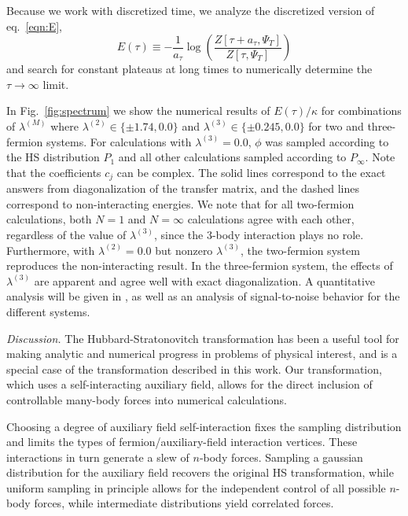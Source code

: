 \documentclass[aps,prl,twocolumn,showpacs,superscriptaddress,groupedaddress, final, nofootinbib]{revtex4}  %
\begin{document}
Because we work with discretized time, we analyze the discretized version of eq.~\eqref{eqn:E},
\begin{equation}
E(\tau)\equiv-\frac{1}{a_\tau}\log\left(\frac{Z[\tau+a_\tau,\Psi_T]}{Z[\tau,\Psi_T]}\right)
\end{equation}
and search for constant plateaus at long times to numerically determine the $\tau\rightarrow\infty$ limit.

In Fig.~\ref{fig:spectrum} we show the numerical results of $E(\tau)/\kappa$ for combinations of $\lambda^{(M)}$ where $\lambda^{(2)}\in\{\pm1.74,0.0\}$ and $\lambda^{(3)}\in\{\pm 0.245,0.0\}$ for two and three-fermion systems.   For calculations with $\lambda^{(3)}=0.0$,  $\phi$ was sampled according to the HS distribution $P_1$ and all other calculations sampled according to $P_\infty$.  Note that the coefficients $c_j$ can be complex.  The solid lines correspond to the exact answers from diagonalization of the transfer matrix, and the dashed lines correspond to non-interacting energies.  We note that for all two-fermion calculations, both $N=1$ and $N=\infty$ calculations agree with each other, regardless of the value of $\lambda^{(3)}$, since the 3-body interaction plays no role.  Furthermore, with $\lambda^{(2)}=0.0$ but nonzero $\lambda^{(3)}$, the two-fermion system reproduces the non-interacting result.  In the three-fermion system, the effects of $\lambda^{(3)}$ are apparent and agree well with exact diagonalization.  A quantitative analysis will be given in \cite{our-long-paper}, as well as an analysis of signal-to-noise behavior for the different systems.




\emph{Discussion.}  The Hubbard-Stratonovitch transformation has been a useful tool for making analytic and numerical progress in problems of physical interest, and is a special case of the transformation described in this work.
Our transformation, which uses a self-interacting auxiliary field, allows for the direct inclusion of controllable many-body forces into numerical calculations.

Choosing a degree of auxiliary field self-interaction fixes the sampling distribution and limits the types of fermion/auxiliary-field interaction vertices.  These interactions in turn generate a slew of $n$-body forces.  Sampling a gaussian distribution for the auxiliary field recovers the original HS transformation, while uniform sampling in principle allows for the independent control of all possible $n$-body forces, while intermediate distributions yield correlated forces.
\end{document}
